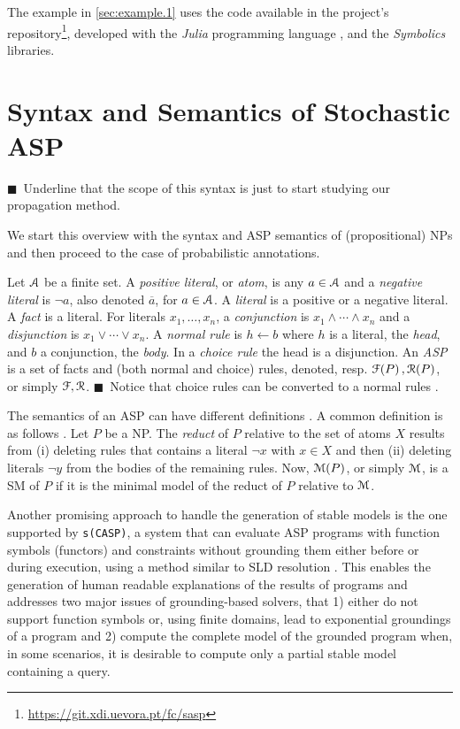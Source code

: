 \documentclass{article}
\newcommand{\at}[1]{\ensuremath{\!\del{#1}}}
\newcommand{\co}[1]{\ensuremath{\overline{#1}}}
\newcommand{\cla}[1]{\ensuremath{{\cal #1}}}
\newcommand{\ATOMSset}{\ensuremath{\cla{A}}}
\newcommand{\FACTSset}{\ensuremath{\cla{F}}}
\newcommand{\RULESset}{\ensuremath{\cla{R}}}
\newcommand{\MODELset}{\ensuremath{\cla{M}}}
\newcommand{\conj}{\ensuremath{\wedge}}
\newcommand{\disj}{\ensuremath{\vee}}
\newcommand{\clause}{\ensuremath{\leftarrow}}
\newcommand{\LOOK}{\ensuremath{\blacksquare}}
\newcommand{\franc}[1]{{\color{green!30!black}#1}}
\begin{document}
The example in \cref{sec:example.1} uses the code available in the
project's
repository\footnote{\url{https://git.xdi.uevora.pt/fc/sasp}},
developed with the \textit{Julia} programming language
\cite{bezanson2017julia}, and the \textit{Symbolics}
\cite{gowda2021high} libraries.
%
%

\section{Syntax and Semantics of Stochastic \ac{ASP}}

\franc{\LOOK~Underline that the scope of this syntax is just to start studying our propagation method.}

We start this overview with the syntax and \ac{ASP} semantics of
(propositional) \aclp{NP} and then proceed to the case of
probabilistic annotations.

Let $\ATOMSset$ be a finite set.  A \textit{positive literal}, or
\textit{atom}, is any $a \in \ATOMSset$ and a \textit{negative
  literal} is $\neg a$, also denoted $\co{a}$, for $a\in\ATOMSset$.  A
\textit{literal} is a positive or a negative literal.  A \textit{fact}
is a literal.  For literals $x_1, \ldots, x_n$, a \emph{conjunction}
is $x_1 \conj \cdots \conj x_n$ and a \textit{disjunction} is
$x_1 \disj \cdots \disj x_n$.  A \textit{normal rule} is $h \clause b$ where
$h$ is a literal, the \textit{head}, and $b$ a conjunction, the
\textit{body}. In a \textit{choice rule} the head is a disjunction. An \textit{\acf{ASP}} is a set of facts and (both normal and choice) rules,
denoted, resp.  $\FACTSset\at{P}, \RULESset\at{P}$,  or simply $\FACTSset, \RULESset$. \franc{\LOOK~Notice that choice rules can be converted to a normal rules \cite{gebser2022answer}.}
%

The semantics of an \ac{ASP} can have different definitions
\cite{lifschitz2008twelve}.  A common definition is as follows
\cite{gelfond1988stable}.  Let $P$ be a \acl{NP}.  The \emph{reduct}
of $P$ relative to the set of atoms $X$ results from (i) deleting
rules that contains a literal $\neg x$ with $x \in X$ and then (ii)
deleting literals $\neg y$ from the bodies of the remaining rules.
Now, $\MODELset\at{P}$, or simply $\MODELset$, is a \acf{SM} of $P$ if it is the minimal model of the reduct
of $P$ relative to $\MODELset$.

%
Another promising approach to handle the generation of stable mo\-dels is the
one supported by \texttt{s(CASP)}, a system that can evaluate ASP
programs with function symbols (functors) and constraints without
grounding them either before or during execution, using a method
similar to SLD resolution
\cite{marple2017computing,arias2020justifications}.  This enables the
generation of human readable explanations of the results of programs
and addresses two major issues of grounding-based solvers, that 1)
either do not support function symbols or, using finite domains, lead
to exponential groundings of a program and 2) compute the complete
model of the grounded program when, in some scenarios, it is desirable
to compute only a partial stable model containing a query.
\end{document}
